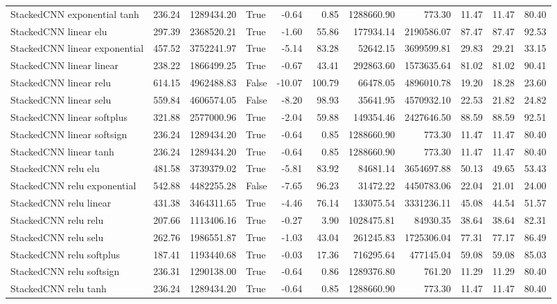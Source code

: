 \begin{tabular}{lrrlrrrrrrr}
StackedCNN exponential tanh & 236.24 & 1289434.20 & True & -0.64 & 0.85 & 1288660.90 & 773.30 & 11.47 & 11.47 & 80.40 \\
StackedCNN linear elu & 297.39 & 2368520.21 & True & -1.60 & 55.86 & 177934.14 & 2190586.07 & 87.47 & 87.47 & 92.53 \\
StackedCNN linear exponential & 457.52 & 3752241.97 & True & -5.14 & 83.28 & 52642.15 & 3699599.81 & 29.83 & 29.21 & 33.15 \\
StackedCNN linear linear & 238.22 & 1866499.25 & True & -0.67 & 43.41 & 292863.60 & 1573635.64 & 81.02 & 81.02 & 90.41 \\
StackedCNN linear relu & 614.15 & 4962488.83 & False & -10.07 & 100.79 & 66478.05 & 4896010.78 & 19.20 & 18.28 & 23.60 \\
StackedCNN linear selu & 559.84 & 4606574.05 & False & -8.20 & 98.93 & 35641.95 & 4570932.10 & 22.53 & 21.82 & 24.82 \\
StackedCNN linear softplus & 321.88 & 2577000.96 & True & -2.04 & 59.88 & 149354.46 & 2427646.50 & 88.59 & 88.59 & 92.51 \\
StackedCNN linear softsign & 236.24 & 1289434.20 & True & -0.64 & 0.85 & 1288660.90 & 773.30 & 11.47 & 11.47 & 80.40 \\
StackedCNN linear tanh & 236.24 & 1289434.20 & True & -0.64 & 0.85 & 1288660.90 & 773.30 & 11.47 & 11.47 & 80.40 \\
StackedCNN relu elu & 481.58 & 3739379.02 & True & -5.81 & 83.92 & 84681.14 & 3654697.88 & 50.13 & 49.65 & 53.43 \\
StackedCNN relu exponential & 542.88 & 4482255.28 & False & -7.65 & 96.23 & 31472.22 & 4450783.06 & 22.04 & 21.01 & 24.00 \\
StackedCNN relu linear & 431.38 & 3464311.65 & True & -4.46 & 76.14 & 133075.54 & 3331236.11 & 45.08 & 44.54 & 51.57 \\
StackedCNN relu relu & 207.66 & 1113406.16 & True & -0.27 & 3.90 & 1028475.81 & 84930.35 & 38.64 & 38.64 & 82.31 \\
StackedCNN relu selu & 262.76 & 1986551.87 & True & -1.03 & 43.04 & 261245.83 & 1725306.04 & 77.31 & 77.17 & 86.49 \\
StackedCNN relu softplus & 187.41 & 1193440.68 & True & -0.03 & 17.36 & 716295.64 & 477145.04 & 59.08 & 59.08 & 85.03 \\
StackedCNN relu softsign & 236.31 & 1290138.00 & True & -0.64 & 0.86 & 1289376.80 & 761.20 & 11.29 & 11.29 & 80.40 \\
StackedCNN relu tanh & 236.24 & 1289434.20 & True & -0.64 & 0.85 & 1288660.90 & 773.30 & 11.47 & 11.47 & 80.40 \\

\end{tabular}
